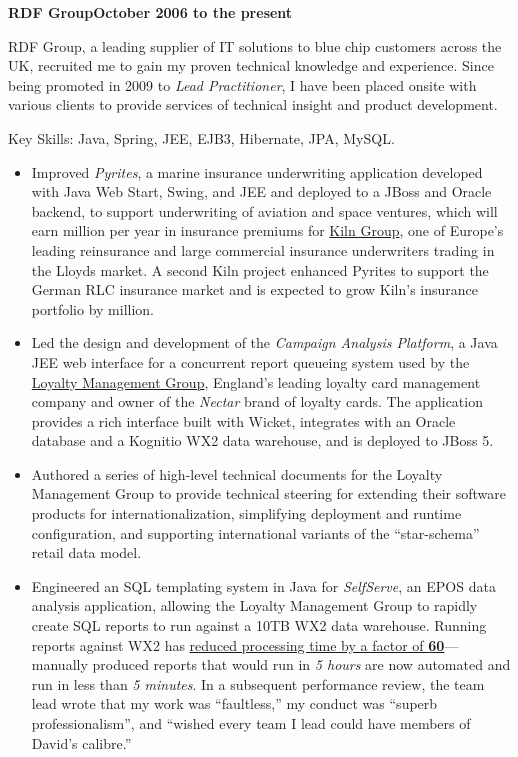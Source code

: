 \documentclass[a4paper,12pt]{article}
\newcommand{\head}[1]{\begin{center}{\large{\textbf{\sc{#1}}}}\nopagebreak\end{center}}
\newcommand{\jobheld}[2]{\textbf{#1\hfill #2}\nopagebreak}
\newcommand{\keyskills}[1]{\vspace{10pt}Key Skills: #1.}
\begin{document}
\head{Professional Experience}

\jobheld{RDF Group}{October 2006 to the present}

RDF Group, a leading supplier of IT solutions to blue chip customers across the UK, recruited me to gain my proven technical knowledge and experience.  Since being promoted in 2009 to \emph{Lead Practitioner}, I have been placed onsite with various clients to provide services of technical insight and product development.

\keyskills{Java, Spring, JEE, EJB3, Hibernate, JPA, MySQL}

\begin{itemize}

\item Improved \emph{Pyrites}, a marine insurance underwriting application developed with Java Web Start, Swing, and JEE and deployed to a JBoss and Oracle backend, to support underwriting of aviation and space ventures, which will earn  million per year in insurance premiums for \href{http://www.kilngroup.com/}{Kiln Group}, one of Europe's leading reinsurance and large commercial insurance underwriters trading in the Lloyds market.  A second Kiln project enhanced Pyrites to support the German RLC insurance market and is expected to grow  Kiln's insurance portfolio by  million.

\item Led the design and development of the \emph{Campaign Analysis Platform}, a Java JEE web interface for a concurrent report queueing system used by the \href{http://www.loyalty.co.uk/}{Loyalty Management Group}, England's leading loyalty card management company and owner of the \emph{Nectar} brand of loyalty cards.  The application provides a rich interface built with Wicket, integrates with an Oracle database and a Kognitio WX2 data warehouse, and is deployed to JBoss 5.

\item Authored a series of high-level technical documents for the Loyalty Management Group to provide technical steering for extending their software products for internationalization, simplifying deployment and runtime configuration, and supporting international variants of the ``star-schema'' retail data model.

\item Engineered an SQL templating system in Java for \emph{SelfServe}, an EPOS data analysis application, allowing the Loyalty Management Group to rapidly create SQL reports to run against a 10TB WX2 data warehouse.  Running reports against WX2 has \href{http://www.kognitio.com/casestudies/casestudy_lmg.php}{reduced processing time by a factor of \textbf{60}}---manually produced reports that would run in \emph{5 hours} are now automated and run in less than \emph{5 minutes}.  In a subsequent performance review, the team lead wrote that my work was ``faultless,'' my conduct was ``superb professionalism'', and ``wished every team I lead could have members of David's calibre.''


\end{itemize}
\end{document}
